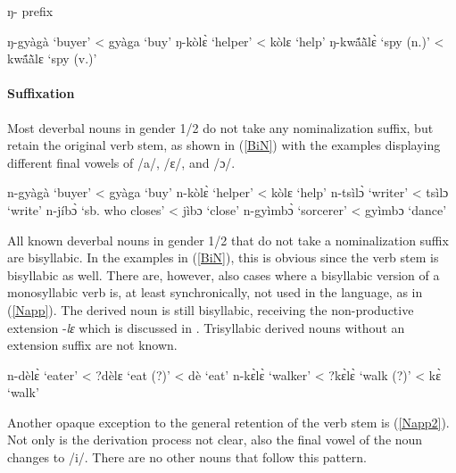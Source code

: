 \begin{exe}
\ex\label{preN} ŋ- prefix
\begin{xlist}
\ex ŋ-gyàgà `buyer' <  gyàga `buy'
\ex  ŋ-kòlɛ̀ `helper' <  kòlɛ `help'
\ex ŋ-kwã́ã̀lɛ̀ `spy (n.)' <  kwã́ã̀lɛ `spy (v.)'
\end{xlist}
\end{exe}



\paragraph{Suffixation} Most deverbal nouns in gender 1/2 do not take any nominalization suffix, but retain the original verb stem, as shown in (\ref{BiN}) with the examples displaying different final vowels of /a/, /ɛ/, and /ɔ/. 


\begin{exe}
\ex\label{BiN} 
\begin{xlist}
\ex n-gyàgà `buyer' < gyàga `buy' 
\ex n-kòlɛ̀ `helper'   < kòlɛ `help'
\ex n-tsìlɔ̀ `writer' < tsìlɔ `write' %
\ex n-jíbɔ̀ `sb. who closes' < jìbɔ `close'
\ex n-gyìmbɔ̀ `sorcerer'   < gyìmbɔ `dance'      
\end{xlist}
\end{exe}

All known deverbal nouns in gender 1/2 that do not take a nominalization suffix are bisyllabic. In the examples in (\ref{BiN}), this is obvious since the verb stem is bisyllabic as well. There are, however, also cases where a bisyllabic version of a monosyllabic verb is, at least synchronically, not used in the language, as in (\ref{Napp}). The derived noun is still bisyllabic, receiving the non-productive extension -{\itshape lɛ} which is discussed in . Trisyllabic derived nouns without an extension suffix are not known.

\begin{exe}
\ex\label{Napp}
\begin{xlist}
\ex  n-dèlɛ̀ `eater' < ?dèlɛ `eat (?)' < dè `eat'
\ex n-kɛ̀lɛ̀ `walker' < ?kɛ̀lɛ̀ `walk (?)' <    kɛ̀ `walk'
\end{xlist}
\end{exe}

\noindent Another opaque exception to the general retention of the verb stem is (\ref{Napp2}). Not only is the derivation process not clear, also the final vowel of the noun changes to /i/. There are no other nouns that follow this pattern.

